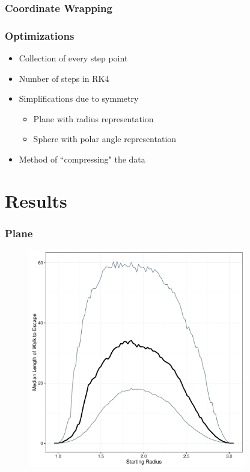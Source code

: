 \documentclass{beamer}
\begin{document}

\begin{frame}
	
	\frametitle{Coordinate Wrapping}
	
	\begin{figure}
		
	\end{figure}
	
\end{frame}

\begin{frame}
	
	\frametitle{Optimizations}
	
	\begin{itemize}
		\item Collection of every step point
		\item Number of steps in RK4
		\item Simplifications due to symmetry
		\begin{itemize}
			\item Plane with radius representation
			\item Sphere with polar angle representation
		\end{itemize}
		\item Method of ``compressing" the data
	\end{itemize}
	
\end{frame}

\section{Results}

\begin{frame}

	\frametitle{Plane}
	
	\begin{figure}
		\includegraphics[width=0.85\textwidth]{images/PlaneIn1Out3.pdf}
	\end{figure}

\end{frame}
\end{document}
